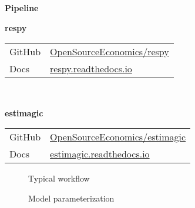 \begin{frame}\begin{center}
\LARGE\textbf{Pipeline}
\end{center}\end{frame}
\begin{frame}
\textbf{respy}\\\vspace{0.3cm}
\begin{tabular}{ll}
GitHub  & \url{OpenSourceEconomics/respy}\\
Docs    & \url{respy.readthedocs.io}\\
\end{tabular}\\\vspace{1cm}

\textbf{estimagic}\\\vspace{0.3cm}
\begin{tabular}{ll}
GitHub	& \url{OpenSourceEconomics/estimagic}\\
Docs    & \url{estimagic.readthedocs.io}\\
\end{tabular}

\end{frame}
\begin{frame}
  \begin{figure}\tiny
    \caption{Typical workflow}
         
   \end{figure}
\end{frame}
\begin{frame}

	\begin{figure}[h!]\centering
	\caption{Model parameterization}\label{Model parameterization}
	\end{figure}

\end{frame}
